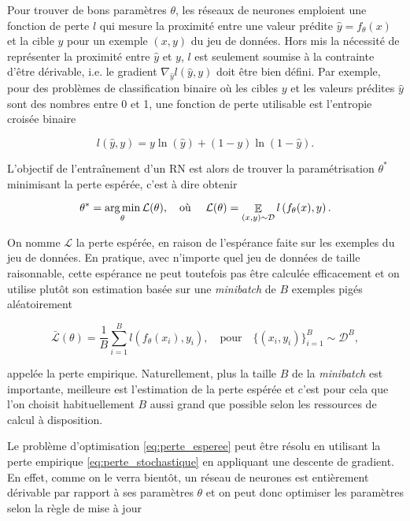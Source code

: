 Pour trouver de bons paramètres $\theta$, les réseaux de neurones 
emploient une fonction de perte $l$ qui mesure la proximité entre 
une valeur prédite $\hat{y}=f_{\theta}(x)$ et la cible $y$ pour 
un exemple $(x,y)$ du jeu de données.
Hors mis la nécessité de représenter la proximité entre 
$\hat{y}$ et $y$, $l$ est seulement soumise 
à la contrainte d'être dérivable, i.e. le gradient $\nabla_{\hat{y}} l(\hat{y}, y)$ 
doit être bien défini.
Par exemple, pour des problèmes de classification binaire 
où les cibles $y$ et les valeurs prédites $\hat{y}$ sont des nombres entre 0 et 1,
une fonction de perte utilisable est l'entropie croisée binaire
\citep{rubinstein2013cross}

\begin{equation*}
    l(\hat{y}, y) = y \ln(\hat{y}) + (1 - y)\ln(1 - \hat{y}).
\end{equation*}

L'objectif de l'entraînement d'un RN est alors de trouver 
la paramétrisation $\theta^*$ minimisant la perte espérée, 
c'est à dire obtenir

\begin{equation}
    \theta^* = \operatorname*{arg\,min}_{\theta} \mathcal{L}(\theta), \text{\quad où \quad} \mathcal{L}(\theta) =  \mathop{\mathbb{E}}_{(x, y) \sim \mathcal{D}} l\left(f_{\theta}(x), y\right).
    \label{eq:perte_esperee}
\end{equation}

On nomme $\mathcal{L}$ la perte espérée, en raison de l'espérance faite 
sur les exemples du jeu de données.
En pratique, avec n'importe quel jeu de données de taille raisonnable,
cette espérance ne peut toutefois pas être calculée efficacement et 
on utilise plutôt son estimation basée sur une \textit{minibatch} de 
$B$ exemples pigés aléatoirement

\begin{equation}
    \bar{\mathcal{L}}(\theta) =  \frac{1}{B} \displaystyle\sum_{i=1}^B l\left(f_{\theta}(x_i), y_i\right), \quad \text{pour} \quad \{(x_i, y_i)\}_{i=1}^B \sim \mathcal{D}^B,
    \label{eq:perte_stochastique}
\end{equation}

appelée la perte empirique.
Naturellement, plus la taille $B$ de la \textit{minibatch} est importante,
meilleure est l'estimation de la perte espérée et c'est pour cela 
que l'on choisit habituellement $B$ aussi grand que possible selon les
ressources de calcul à disposition.

Le problème d'optimisation \eqref{eq:perte_esperee} peut être résolu en
utilisant la perte empirique \eqref{eq:perte_stochastique}
en appliquant une descente de gradient.
En effet, comme on le verra bientôt, un réseau de neurones 
est entièrement dérivable par rapport à ses paramètres $\theta$ et 
on peut donc optimiser les paramètres selon la 
règle de mise à jour 

